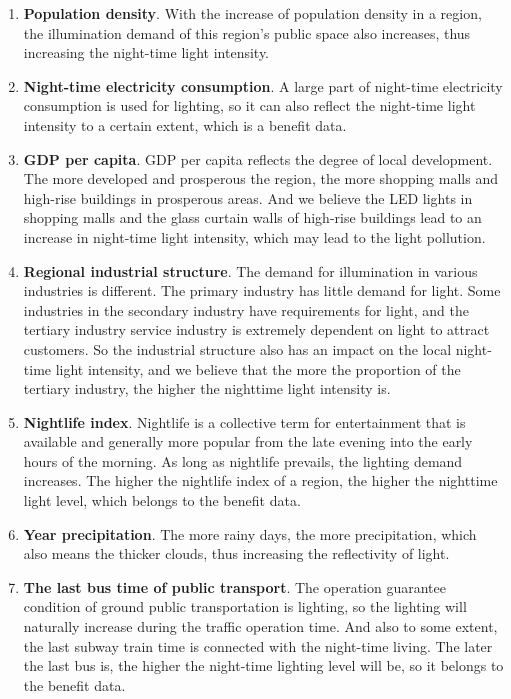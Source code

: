 \begin{enumerate}
    \item \textbf{Population density}. With the increase of population density in a region, the illumination demand of this region's public space also increases, thus increasing the night-time light intensity.
 
    \item \textbf{Night-time electricity consumption}. A large part of night-time electricity consumption is used for lighting, so it can also reflect the night-time light intensity to a certain extent, which is a benefit data. 
     
    \item \textbf{GDP per capita}. GDP per capita reflects the degree of local development. The more developed and prosperous the region, the more shopping malls and high-rise buildings in prosperous areas. And we believe the LED lights in shopping malls and the glass curtain walls of high-rise buildings lead to an increase in night-time light intensity, which may lead to the light pollution.
     
    \item \textbf{Regional industrial structure}. The demand for illumination in various industries is different. The primary industry has little demand for light. Some industries in the secondary industry have requirements for light, and the tertiary industry service industry is extremely dependent on light to attract customers. So the industrial structure also has an impact on the local night-time light intensity, and we believe that the more the proportion of the tertiary industry, the higher the nighttime light intensity is. 
     
    \item \textbf{Nightlife index}. Nightlife is a collective term for entertainment that is available and generally more popular from the late evening into the early hours of the morning. As long as nightlife prevails, the lighting demand increases. The higher the nightlife index of a region, the higher the nighttime light level, which belongs to the benefit data.
    
    \item \textbf{Year precipitation}. The more rainy days, the more precipitation, which also means the thicker clouds, thus increasing the reflectivity of light. 

    \item \textbf{The last bus time of public transport}. The operation guarantee condition of ground public transportation is lighting, so the lighting will naturally increase during the traffic operation time. And also to some extent, the last subway train time is connected with the night-time living. The later the last bus is, the higher the night-time lighting level will be, so it belongs to the benefit data.
    
\end{enumerate}

